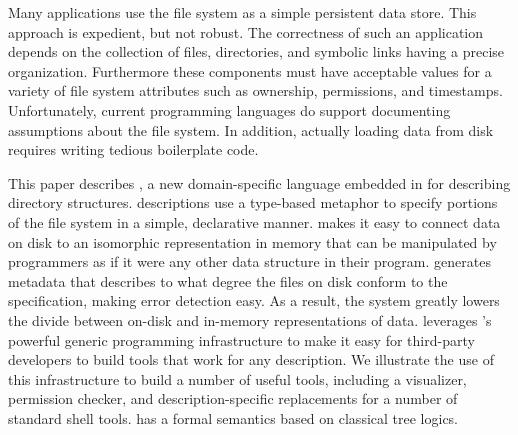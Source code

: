 Many applications use the file system as a simple persistent data
store.  This approach is expedient, but not robust.  
The correctness of such an application depends on the
collection of files, directories, and symbolic links having a
precise organization. Furthermore these components must have
acceptable values for a variety of file system attributes 
such as ownership, permissions, and timestamps. Unfortunately, current
programming languages do support documenting assumptions about the
file system. In 
addition, actually loading data from disk requires writing tedious
boilerplate code.

This paper describes \forest{}, a new domain-specific language
embedded in \haskell{} for describing directory structures. \forest{}
descriptions use a type-based metaphor to specify portions of the file
system in a simple, declarative manner.  \forest{} makes it easy to
connect data on disk to an isomorphic representation in memory that
can be manipulated by programmers as if it were any other data
structure in their program.  \forest{} generates metadata that
describes to what degree the files on disk conform to the
specification, making error detection easy. As a result, the system greatly lowers
the divide between on-disk and in-memory representations of
data. \forest{} leverages \haskell{}'s powerful generic programming
infrastructure to make it easy for third-party developers to build
tools that work for any \forest{} description.  We illustrate the use
of this infrastructure to build a number of useful tools, including a
visualizer, permission checker, and description-specific replacements for a
number of standard shell tools. \forest{} has a formal semantics based
on classical tree logics.

